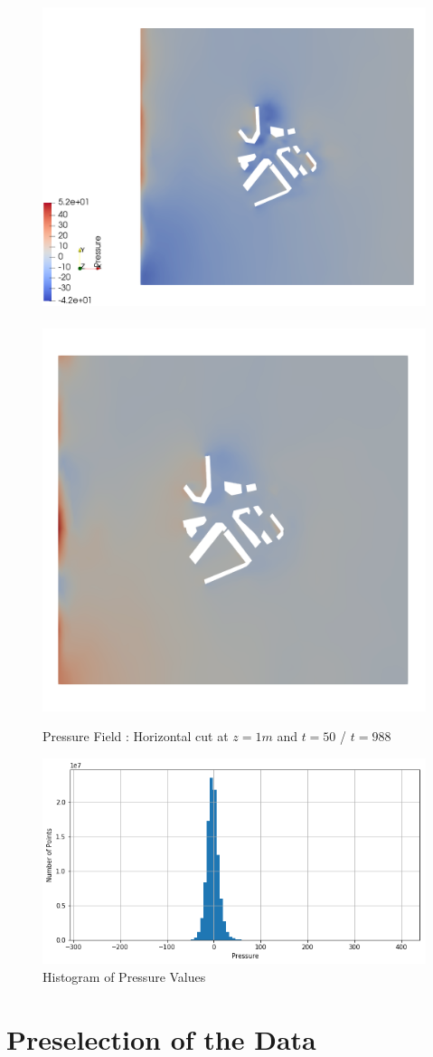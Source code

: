 \begin{figure}[h]
\centering
\includegraphics[height = 0.4 \textwidth]{figures/Analysis/pressure050cutZ1}
~
	\includegraphics[height = 0.4 \textwidth]{figures/Analysis/pressure988cutZ1}
	\caption{Pressure Field : Horizontal cut at $z=1m$ and $t=50$ / $t=988$ }
	\label{fig:pressure:viz988}
\end{figure}

\begin{figure}[h]
\centering
	\includegraphics[width = 0.6 \textwidth]{figures/DataAnalysis/HistoGramPressure}
	\caption{Histogram of Pressure Values}
	\label{fig:pressure:hist}
\end{figure}


\section{Preselection of the Data} \label{sec:preselection}
%
%
%


